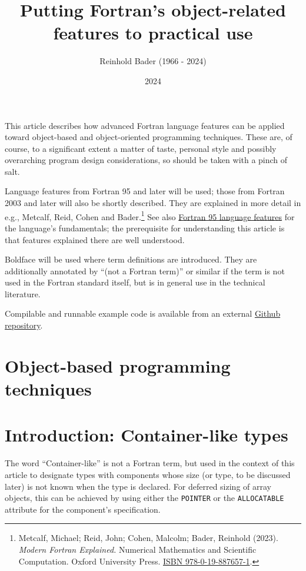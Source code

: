 \documentclass[
]{article}
\title{Putting Fortran's object-related features to practical use}
\author{Reinhold Bader (1966 - 2024)}
\date{2024}
\begin{document}
\maketitle

This article describes how advanced Fortran language features can be
applied toward object-based and object-oriented programming techniques.
These are, of course, to a significant extent a matter of taste,
personal style and possibly overarching program design considerations,
so should be taken with a pinch of salt.

Language features from Fortran 95 and later will be used; those from
Fortran 2003 and later will also be shortly described. They are
explained in more detail in e.g., Metcalf, Reid, Cohen and
Bader.\footnote{Metcalf, Michael; Reid, John; Cohen, Malcolm; Bader,
  Reinhold (2023). \emph{Modern Fortran Explained.} Numerical
  Mathematics and Scientific Computation. Oxford University Press.
  \href{https://en.wikipedia.org/wiki/Special:BookSources/978-0-19-887657-1}{ISBN
  978-0-19-887657-1}.} See also
\href{https://en.wikipedia.org/wiki/Fortran_95_language_features}{Fortran
95 language features} for the language's fundamentals; the prerequisite
for understanding this article is that features explained there are well
understood.

Boldface will be used where term definitions are introduced. They are
additionally annotated by ``(not a Fortran term)'' or similar if the
term is not used in the Fortran standard itself, but is in general use
in the technical literature.

Compilable and runnable example code is available from an external
\href{https://github.com/reinh-bader/object_fortran}{Github repository}.

\section{Object-based programming techniques}\label{sec:oop_techniques}

\section{Introduction: Container-like
types}\label{introduction-container-like-types}

The word ``Container-like'' is not a Fortran term, but used in the
context of this article to designate types with components whose size
(or type, to be discussed later) is not known when the type is declared.
For deferred sizing of array objects, this can be achieved by using
either the \texttt{POINTER} or the \texttt{ALLOCATABLE} attribute for
the component's specification.
\end{document}
